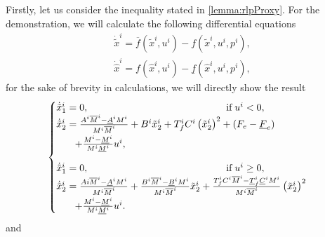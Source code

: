 Firstly, let us consider the inequality stated in \eqref{lemma:rlpProxy}. For the demonstration, we will calculate the following differential equations
\begin{align*}
	\dot{\tilde{x}}^i = \overline{f}\left(\tilde{x}^i, u^i \right) - f\left(\tilde{x}^i, u^i, p^i \right), \\
	\dot{\hat{x}}^i = f\left(\hat{x}^i, u^i \right) - \underline{f}\left(\hat{x}^i, u^i, p^i \right),
\end{align*}
for the sake of brevity in calculations, we will directly show the result
\begin{equation}
	\label{eq:lemmarup}
	\begin{cases}
		\dot{\tilde{x}}_1^i =   0, \qquad  \qquad \qquad \qquad \qquad \qquad  \qquad  \text{if} \; u^i < 0,  \\
		\dot{\tilde{x}}_2^i = \frac{A^i \overline{M}^i - \underline{A}^i M^i}{M^i \overline{M}^i} + B^i \tilde{x}_2^i + T_f^i C^i \left(\tilde{x}_2^i\right)^2+ \left(F_e - \underline{F}_e\right) \\ \noalign{\vskip3pt} \quad \; \;\  + \frac{M^i-\underline{M}^i}{M^i \underline{M}^i}u^i, \\ 
		\noalign{\vskip9pt}
		\dot{\tilde{x}}_1^i =   0, \qquad  \qquad \qquad \qquad \qquad \qquad  \qquad  \text{if} \; u^i \geq 0,  \\
		\dot{\tilde{x}}_2^i = \frac{Ai \overline{M}^i - \underline{A}^i M^i}{M^i \overline{M}^i} + \frac{B^i \overline{M}^i - \underline{B}^i M^i}{M^i \overline{M}^i} \tilde{x}_2^i + \frac{T_f^i C^i \overline{M}^i - \underline{T}_f^i\underline{C}^i M^i}{M^i \overline{M}^i}  \left(\tilde{x}_2^i\right)^2 \\  
		\noalign{\vskip3pt} \quad \; \;\ + \frac{M^i-\underline{M}^i}{M^i \underline{M}^i}u^i. \\ 
	\end{cases}
\end{equation}
and 
